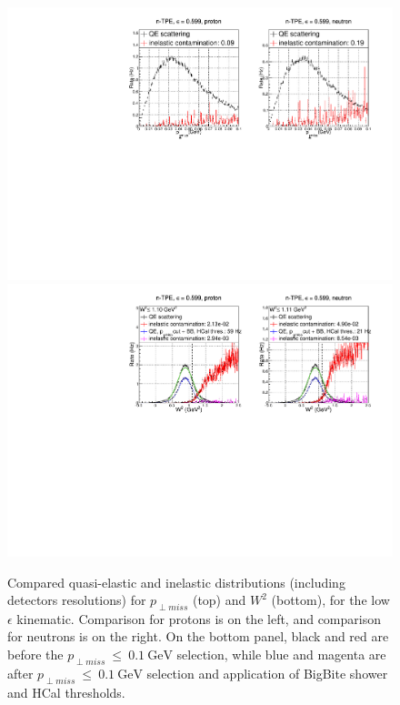\begin{figure}[!h]
  \begin{center}
    \includegraphics[width=12cm]{Plots/gen-tpe_le_pperp_acc.pdf}
    \includegraphics[width=12cm]{Plots/gen-tpe_le_W2_acc.pdf}
    \caption{Compared quasi-elastic and inelastic distributions (including detectors resolutions) for $p_{\perp miss}$ (top) and $W^2$ (bottom), for the low $\epsilon$ kinematic. Comparison for protons is on the left, and comparison for neutrons is on the right. On the bottom panel, black and red are before the $p_{\perp miss}~\leq~0.1~\mathrm{GeV}$ selection, while blue and magenta are after $p_{\perp miss}~\leq~0.1~\mathrm{GeV}$ selection and application of BigBite shower and HCal thresholds.}
    \label{fig:inel_contam_le}
  \end{center}
\end{figure}
%
